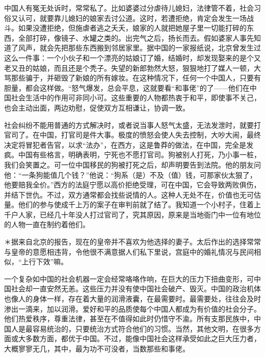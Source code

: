 \documentclass[12pt,oneside]{book}
\begin{document}
\begin{common-format}
中国人有冤无处诉时，常常私了。比如婆婆过分虐待儿媳妇，法律管不着，社会习俗又认可，就要靠儿媳妇的娘家去讨公道。这时，若遭拒绝，肯定会发生一场战斗。如果没遭拒绝，但施虐者逃之夭夭，娘家的人就把她屋子里一切能打碎的东西，全部打碎，像镜子、水罐之类的。出完气之后，扬长而去。假如婆家人事先知道了风声，就会先把那些东西搬到邻居家里。据中国的一家报纸说，北京曾发生过这么一件事：一个小伙子和一个漂亮的姑娘订了婚，结婚时，却发现娶来的是个又老又丑的姑娘，而且还是个秃子。失望的新郎勃然大怒，狠狠地打了媒人一顿，大骂那些骗于，并砸毁了新娘的所有嫁妆。在这种情况下，任何一个中国人，只要有胆量，都会这样做。“怒气爆发，总会平息，这就要看“和事佬”的了——他们在中国社会生活中的作用可非同小可。这些重要的人物都热衷于和平，即使事不关己，也会主动出面，两边劝慰，促使双方互相谦让，协调一致。 

社会纠纷不能用普通的方式解决时，或者说当事人怒气太盛，无法发泄时，就要打官司了。在中国，打官司是件大事。极度的愤怒会使人失去控制，大吵大闹，最终决定将冒犯者告官，以求“法办”，在西方，这是鲁莽的做法，在中国，完全是发疯。中国有些格言，明确表明，宁死也不愿打官司。狗被别人打死，乃小事一桩，我们会笑置之。可一位中国移民的狗被打死之后，却声明要告到法院。他的朋友问他：“一条狗能值几个钱？”他说：“狗系（是）不及（值）钱，可那家伙太狠了，他要赔我全价。”西方的法庭宁愿以高价拒绝受理，可在中国，它会导致两败俱伤，并结下世仇。不过，双方通常都会找些说情的人。这种人无处不在，价值也无可估量。他们的参与使成千上万的案子在审判前就了结了。我知道一个小村子，住着上千户人家，已经几十年没人打过官司了，究其原因，原来是当地衙门中一位有地位的人物一直在制约着他们。 

＊据来自北京的报告，现在的皇帝并不喜欢为他选择的妻子。太后作出的选择常常与皇帝的意愿相违背，令他很不满意据人们私下里说，宫庭中的婚礼情况与民间相似，“上行下效”嘛。 

一个复杂如中国的社会机器一定会经常咯咯作响，在巨大的压力下扭曲变形，可中国社会却一直安然无恙。这些压力并没有使中国社会破产、毁灭。中国的政治机体也像人的身体一样，存在着大量的润滑液囊，在最需要时。最需要处，往往会及时渗出一滴来，加以润滑。爱好和平的品质使每个中国人都成为有价值的社会分子。他们热爱秩序，尊重法律，甚至在不值得如此时仍惜守不渝。所有支那民族中，中国人是最容易统治的，只要统治方式符合他们的习惯。当然，其他文明，在很多方面或大多数方面，都优于中国。不过，能像中国社会这样承受如此之巨大压力者，大概寥寥无几，其中，最为功不可没者，当数那些和事佬。



\end{common-format}
\end{document}
